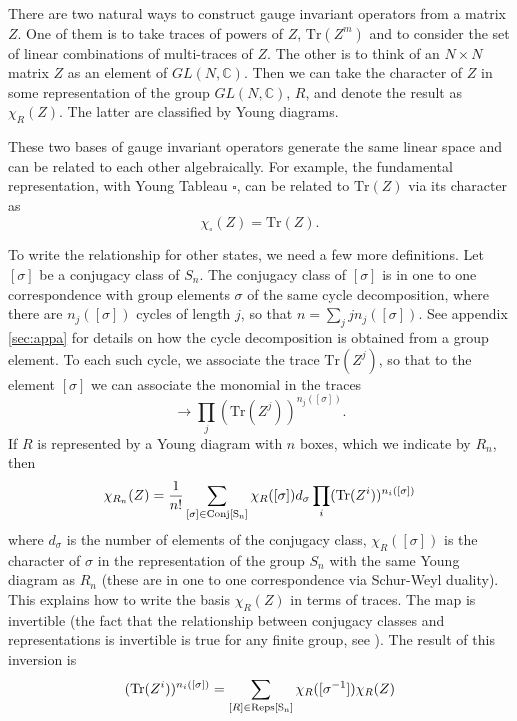 \documentclass[12pt,nofootinbib, longbibliography]{revtex4-1}
\newcommand{\BC}{\mathbb {C}}
\def\Tr{\textrm{Tr}}
\begin{document}
There are two natural ways to construct gauge invariant operators from a matrix $Z$. One of them is to take 
traces of powers of $Z$, $\Tr(Z^m)$ and to consider the set of linear combinations of multi-traces of $Z$. The other is to think of an $N\times N$ matrix $Z$ as an element of
$GL(N,\BC)$. Then we can take the character of $Z$ in some representation of the group $GL(N,\BC)$,  $R$, and denote the result as
$\chi_R(Z)$. The latter are classified by Young diagrams.

These two bases of gauge invariant operators generate the same linear space and can be related to each other algebraically. For example, the fundamental representation, with Young Tableau $\square$, can be related to $\Tr(Z)$ via its character as
\begin{equation}
\chi_{\square}(Z)= \Tr(Z).
\end{equation}

To write the relationship for other states, we need a few more definitions.
Let $[\sigma]$ be a conjugacy class of $S_n$. The conjugacy class of $[\sigma]$  is in one to one correspondence with group elements $\sigma$ of the same cycle decomposition, where there are $n_j([\sigma])$ cycles of length $j$, so that $n=\sum_j j n_j([\sigma])$.
See appendix \ref{sec:appa} for details on how the cycle decomposition is obtained from a group element.
To each such cycle, we associate the trace $\Tr(Z^j)$, so that to the element $[\sigma]$ we can associate the 
 monomial in the traces 
 \begin{equation}
 [\sigma]\to \prod_j (\Tr(Z^j))^{n_j([\sigma])}.
 \end{equation} 
If $R$ is represented by a Young diagram with $n$ boxes, which we indicate by $R_n$,  then
\begin{equation}
\chi_{R_n}(Z) =  \frac 1 {n!} \sum_{[\sigma] \in \rm{Conj}[S_n]} \chi_R([\sigma]) d_\sigma \prod_i (\Tr(Z^i))^{n_i([\sigma])}
\end{equation}
where $d_\sigma$ is the number of elements of the conjugacy class,   $\chi_R([\sigma])$ is the character of $\sigma$ in the representation of the group $S_n$ with the same Young diagram as 
$R_n$ (these are in one to one correspondence via Schur-Weyl duality). 
This explains how to write the basis $\chi_R(Z)$ in terms of traces. The map is invertible (the fact that the relationship between conjugacy classes and representations is invertible is true for any finite group, see  \cite{fulton2013representation}). The result of this inversion is 
\begin{equation}
(\Tr(Z^i))^{n_i([\sigma])}= \sum_{[R] \in \rm{Reps}[S_n]} \chi_R([\sigma^{-1}])\chi_{R}(Z)
\end{equation}
\end{document}
